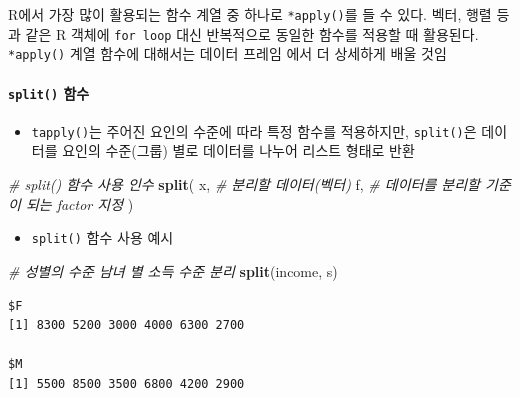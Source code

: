 \documentclass[
  11pt,
]{krantz}
\newenvironment{Shaded}{\begin{snugshade}}{\end{snugshade}}
\newcommand{\CommentTok}[1]{\textcolor[rgb]{0.37,0.37,0.37}{\textit{#1}}}
\newcommand{\KeywordTok}[1]{\textcolor[rgb]{0.27,0.27,0.27}{\textbf{#1}}}
\newcommand{\NormalTok}[1]{#1}
\providecommand{\tightlist}{%
  \setlength{\itemsep}{0pt}\setlength{\parskip}{0pt}}
\let\BeginKnitrBlock\begin \let\EndKnitrBlock\end
\begin{document}
\normalsize

\footnotesize

\BeginKnitrBlock{rmdnote}
R에서 가장 많이 활용되는 함수 계열 중 하나로 \texttt{*apply()}를 들 수 있다. 벡터, 행렬 등과 같은 R 객체에 \texttt{for\ loop} 대신 반복적으로 동일한 함수를 적용할 때 활용된다. \texttt{*apply()} 계열 함수에 대해서는 데이터 프레임 에서 더 상세하게 배울 것임
\EndKnitrBlock{rmdnote}

\normalsize

\hypertarget{split}{%
\paragraph{\texorpdfstring{\texttt{split()} 함수}{split() 함수}}\label{split}}

\begin{itemize}
\tightlist
\item
  \texttt{tapply()}는 주어진 요인의 수준에 따라 특정 함수를 적용하지만, \texttt{split()}은 데이터를 요인의 수준(그룹) 별로 데이터를 나누어 리스트 형태로 반환
\end{itemize}

\footnotesize

\begin{Shaded}
\begin{Highlighting}[]
\CommentTok{# split() 함수 사용 인수}
\KeywordTok{split}\NormalTok{(}
\NormalTok{  x, }\CommentTok{# 분리할 데이터(벡터)}
\NormalTok{  f, }\CommentTok{# 데이터를 분리할 기준이 되는 factor 지정}
\NormalTok{)}
\end{Highlighting}
\end{Shaded}

\normalsize

\begin{itemize}
\tightlist
\item
  \texttt{split()} 함수 사용 예시
\end{itemize}

\footnotesize

\begin{Shaded}
\begin{Highlighting}[]
\CommentTok{# 성별의 수준 남녀 별 소득 수준 분리}
\KeywordTok{split}\NormalTok{(income, s)}
\end{Highlighting}
\end{Shaded}

\begin{verbatim}
$F
[1] 8300 5200 3000 4000 6300 2700

$M
[1] 5500 8500 3500 6800 4200 2900
\end{verbatim}
\end{document}
